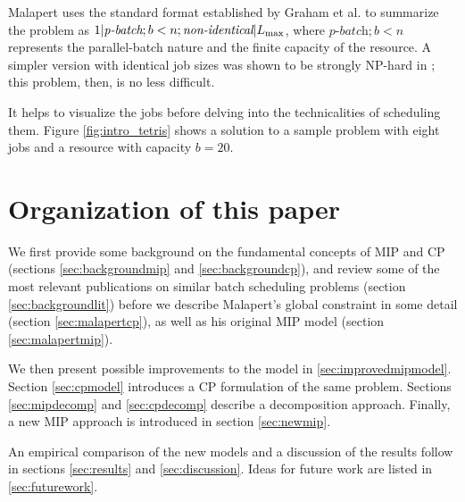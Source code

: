 \documentclass[13pt, letterpaper, oneside]{book}
\begin{document}
Malapert uses the standard format established by Graham et al. to
summarize the problem as $1|\textit{p-batch}; b < n;
\textit{non-identical}|L_{\text{max}}$, where $\textit{p-batch};b<n$ represents the
parallel-batch nature and the finite capacity of the resource. A simpler version
with identical job sizes was shown to be strongly NP-hard in \citep{Brucker};
this problem, then, is no less difficult.

It helps to visualize the jobs before delving into the technicalities of
scheduling them. Figure \ref{fig:intro_tetris} shows a solution to a sample
problem with eight jobs and a resource with capacity $b = 20$.


\section{Organization of this paper}
We first provide some background on the fundamental concepts of MIP and CP
(sections \ref{sec:backgroundmip} and \ref{sec:backgroundcp}), and
review some of the most relevant publications on similar batch scheduling
problems (section \ref{sec:backgroundlit}) before we describe Malapert's global
constraint in some detail (section \ref{sec:malapertcp}), as well as his
original MIP model (section \ref{sec:malapertmip}).

We then present possible improvements to the
model in \ref{sec:improvedmipmodel}. Section \ref{sec:cpmodel} introduces a CP
formulation of the same problem. Sections \ref{sec:mipdecomp} and
\ref{sec:cpdecomp} describe a decomposition approach. Finally, a new MIP approach
is introduced in section \ref{sec:newmip}.

An empirical comparison of the new models and a discussion of the results follow in
sections \ref{sec:results} and \ref{sec:discussion}. Ideas for future work are
listed in \ref{sec:futurework}.

\end{document}
